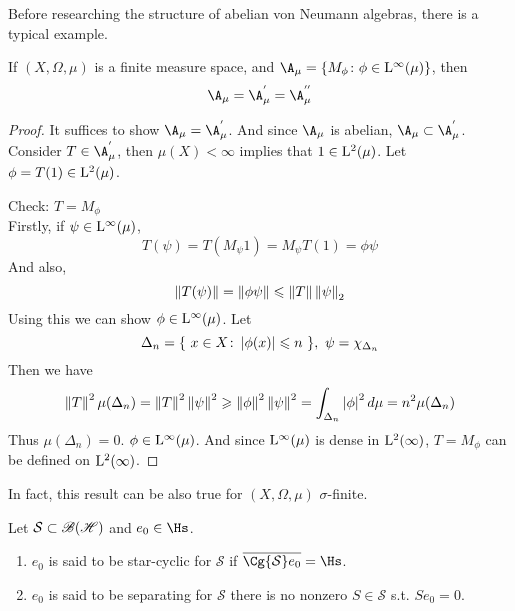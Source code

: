 Before researching the structure of abelian von Neumann algebras, there is a typical example.
\begin{exam}
	If $(X,\Omega,\mu)$ is a finite measure space, and $\A_{\mu} = \{M_{\phi} \colon \phi \in \lfs{\infty}(\mu)\}$, then
	\begin{equation*}
		\A_{\mu} = \A_{\mu}^{'} = \A_{\mu}^{''}
	\end{equation*}
\end{exam}
\begin{proof}
	It suffices to show $\A_{\mu} = \A_{\mu}^{'}$. And since $\A_{\mu}$ is abelian, $\A_{\mu} \subset \A_{\mu}^{'}$. Consider $T \in \A_{\mu}^{'}$, then $\mu(X) < \infty$ implies that $1 \in \mathrm{L^{2}}(\mu)$. Let $\phi = T(1) \in \mathrm{L^{2}}(\mu)$. 
	\item Check: $T=M_{\phi}$ \\
	Firstly, if $\psi \in \mathrm{L^{\infty}}(\mu)$, 
	\begin{equation*}
		T(\psi) = T(M_{\psi}1) = M_{\psi}T(1) = \phi\psi
	\end{equation*}
	And also,
	\begin{equation*}
		\left\lVert T(\psi)\right\lVert = \left\lVert\phi\psi\right\lVert \leqslant \left\lVert T\right\lVert\left\lVert\psi\right\lVert_2
	\end{equation*}
	Using this we can show $\phi \in \mathrm{L^{\infty}}(\mu)$. Let 
	\begin{equation*}
		\Delta_n = \{~ x \in X \colon \left\lvert\phi(x)\right\lvert \leqslant n ~\},~ \psi = \chi_{\Delta_n}
	\end{equation*}
	Then we have 
	\begin{equation*}
		\left\lVert T\right\lVert^2\mu(\Delta_n) = \left\lVert T\right\lVert^2 \left\lVert\psi\right\lVert^2 \geqslant \left\lVert\phi\right\lVert^2\left\lVert\psi\right\lVert^2 = \int_{\Delta_n}\left\lvert\phi\right\lvert^2 d\mu = n^2\mu(\Delta_n)
	\end{equation*}
	Thus $\mu(\Delta_n)=0$. $\phi \in \mathrm{L^{\infty}}(\mu)$. And since $\mathrm{L^{\infty}}(\mu)$ is dense in $\mathrm{L^{2}}(\infty)$, $T=M_{\phi}$ can be defined on $\mathrm{L^{2}}(\infty)$.
\end{proof}
\begin{rem}
	In fact, this result can be also true for $(X,\Omega,\mu)$ $\sigma$-finite.
\end{rem}

\begin{defn}
	Let $\mathcal{S} \subset \mathscr{B(H)}$ and $e_0 \in \Hs$.
	\begin{enumerate}[label=\arabic*)]
		\item $e_0$ is said to be star-cyclic for $\mathcal{S}$ if $\clo{\Cg{\mathcal{S}}e_0} = \Hs$.
		\item $e_0$ is said to be separating for $\mathcal{S}$ there is no nonzero $S \in \mathcal{S}$ s.t. $Se_0=0$.
	\end{enumerate}
\end{defn}

